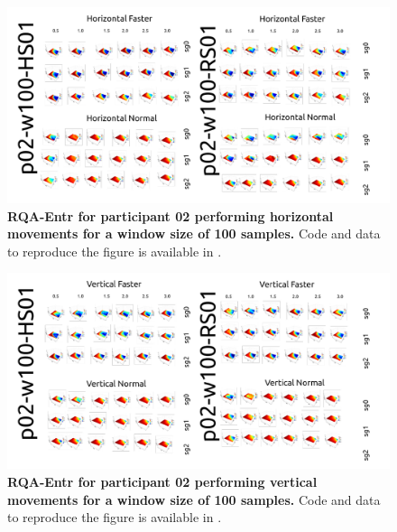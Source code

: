 \documentclass[12pt]{article}
\begin{document}
\newpage
\begin{figure}[ht!]
\centering
\includegraphics[scale=1.0]{sm-fig09}
    	\caption{
	{\bf RQA-Entr for participant 02 performing horizontal movements for a window size of 100 samples.}
	Code and data to reproduce the figure is available in \cite{srep2021}.
        }
    \label{fig-p02-H-w100}
\end{figure}
\begin{figure}[hb!]
\centering
\includegraphics[scale=1.0]{sm-fig10}
    	\caption{
	{\bf RQA-Entr for participant 02 performing vertical movements for a window size of 100 samples.}
	Code and data to reproduce the figure is available in \cite{srep2021}.
        }
    \label{fig-p02-V-w100}
\end{figure}
\end{document}
